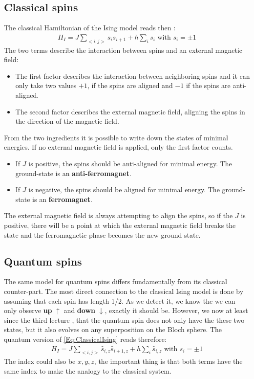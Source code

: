 \documentclass[10pt]{article}
\let\cite\citep
\providecommand\citep{\cite}
\begin{document}
\subsection{Classical spins}
The classical Hamiltonian of the Ising model reads then :
\begin{align}\label{Eq:ClassicalIsing}
H_I = J \sum_{<i,j>} s_i s_{i+1}+h \sum_i s_i \text{ with }s_i = \pm 1
\end{align}
The two terms describe the interaction between spins and an external magnetic field:
\begin{itemize}
\item The first factor describes the interaction between neighboring spins and it can only take two values $+1$, if the spins are aligned and $-1$ if the spins are anti-aligned.
\item The second factor describes the external magnetic field, aligning the spins in the direction of the magnetic field.
\end{itemize}
From the two ingredients it is possible to write down the states of minimal energies. If no external magnetic field is applied, only the first factor counts.
\begin{itemize}
 \item If $J$ is positive, the spins should be anti-aligned for minimal energy. The ground-state is an \textbf{anti-ferromagnet}.
 \item If $J$ is negative, the spins should be aligned for minimal energy. The ground-state is an \textbf{ferromagnet}.
\end{itemize}
The external magnetic field is always attempting to align the spins, so if the $J$ is positive, there will be a point at which the external magnetic field breaks the state and the ferromagnetic phase becomes the new ground state.


\subsection{Quantum spins}

The same model for quantum spins differs fundamentally from its classical counter-part. The most direct connection to the classical Ising model is done by assuming that each spin has length 1/2. As we detect it, we know the we can only observe \textbf{up} $\uparrow$ and \textbf{down} $\downarrow$, exactly it should be. However, we now at least since the third lecture \cite{Jendrzejewski}, that the quantum spin does not only have the these two states, but it also evolves on any superposition on the Bloch sphere. The quantum version of \eqref{Eq:ClassicalIsing} reads therefore:
\begin{align}\label{Eq:ClassicalIsing}
H_{I} = J \sum_{<i,j>} \hat{s}_{i,z} \hat{s}_{i+1, z}+h \sum_i \hat{s}_{i,z} \text{ with }s_i = \pm 1
\end{align}
The index could also be $x,y,z$, the important thing is that both terms have the same index to make the analogy to the classical system.
\end{document}

